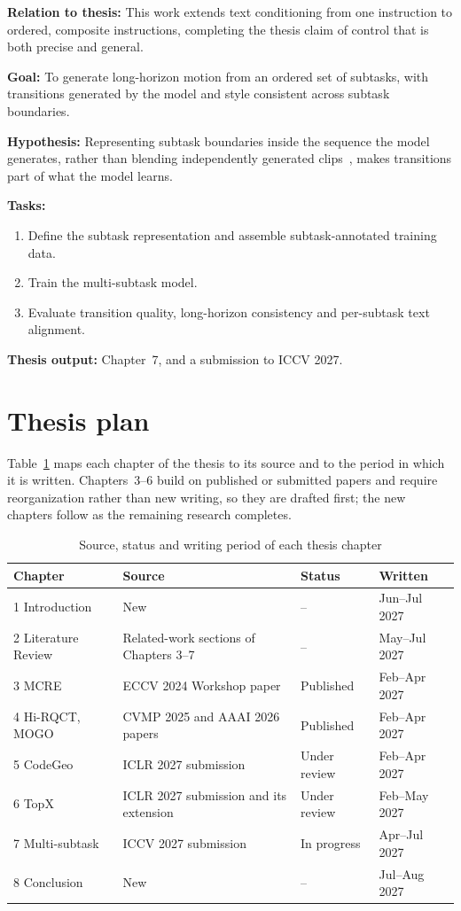 \documentclass[11pt,a4paper]{report}
\newcommand{\workitem}[5]{%
  \noindent\textbf{Relation to thesis:} #1\par\smallskip
  \noindent\textbf{Goal:} #2\par\smallskip
  \noindent\textbf{Hypothesis:} #3\par\smallskip
  \noindent\textbf{Tasks:} #4\par\smallskip
  \noindent\textbf{Thesis output:} #5\par}
\begin{document}
\workitem{%
This work extends text conditioning from one instruction to ordered, composite
instructions, completing the thesis claim of control that is both precise and
general.}{%
To generate long-horizon motion from an ordered set of subtasks, with
transitions generated by the model and style consistent across subtask
boundaries.}{%
Representing subtask boundaries inside the sequence the model generates, rather
than blending independently generated
clips~\cite{shafir2024priormdm,barquero2024flowmdm}, makes transitions part of
what the model learns.}{%
\begin{enumerate}
\item Define the subtask representation and assemble subtask-annotated training
  data.
\item Train the multi-subtask model.
\item Evaluate transition quality, long-horizon consistency and per-subtask text
  alignment.
\end{enumerate}}{%
Chapter~7, and a submission to ICCV 2027.}

\section{Thesis plan}

Table~\ref{tab:thesisplan} maps each chapter of the thesis to its source and to
the period in which it is written. Chapters~3--6 build on published or submitted
papers and require reorganization rather than new writing, so they are drafted
first; the new chapters follow as the remaining research completes.

\begin{table}[h]
\centering\small
\begin{tabularx}{\textwidth}{@{}l X l l@{}}
\toprule
\textbf{Chapter} & \textbf{Source} & \textbf{Status} & \textbf{Written}\\
\midrule
1 Introduction & New & -- & Jun--Jul 2027\\
2 Literature Review & Related-work sections of Chapters 3--7 & -- &
  May--Jul 2027\\
3 MCRE & ECCV 2024 Workshop paper & Published & Feb--Apr 2027\\
4 Hi-RQCT, MOGO & CVMP 2025 and AAAI 2026 papers & Published &
  Feb--Apr 2027\\
5 CodeGeo & ICLR 2027 submission & Under review & Feb--Apr 2027\\
6 TopX & ICLR 2027 submission and its extension & Under review &
  Feb--May 2027\\
7 Multi-subtask & ICCV 2027 submission & In progress & Apr--Jul 2027\\
8 Conclusion & New & -- & Jul--Aug 2027\\
\bottomrule
\end{tabularx}
\caption{Source, status and writing period of each thesis chapter}
\label{tab:thesisplan}
\end{table}
\end{document}
